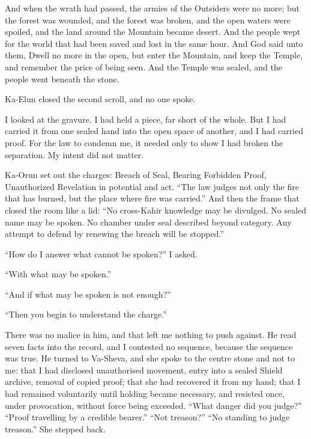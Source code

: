 \begin{scripture}
And when the wrath had passed, the armies of the Outsiders were no more; but the forest was wounded, and the forest was broken, and the open waters were spoiled, and the land around the Mountain became desert.
And the people wept for the world that had been saved and lost in the same hour.
And God said unto them, Dwell no more in the open, but enter the Mountain, and keep the Temple, and remember the price of being seen.
And the Temple was sealed, and the people went beneath the stone.
\end{scripture}
 
Ka-Elun closed the second scroll, and no one spoke.\par
 
I looked at the gravure. I had held a piece, far short of the whole. But I had carried it from one sealed hand into the open space of another, and I had carried proof. For the law to condemn me, it needed only to show I had broken the separation. My intent did not matter.\par
 
Ka-Orun set out the charges: Breach of Seal, Bearing Forbidden Proof, Unauthorized Revelation in potential and act. ``The law judges not only the fire that has burned, but the place where fire was carried.'' And then the frame that closed the room like a lid: ``No cross-Kahir knowledge may be divulged. No sealed name may be spoken. No chamber under seal described beyond category. Any attempt to defend by renewing the breach will be stopped.''\par
 
``How do I answer what cannot be spoken?'' I asked.\par
 
``With what may be spoken.''\par
 
``And if what may be spoken is not enough?''\par
 
``Then you begin to understand the charge.''\par
 
There was no malice in him, and that left me nothing to push against. He read seven facts into the record, and I contested no sequence, because the sequence was true. He turned to Va-Sheva, and she spoke to the centre stone and not to me: that I had disclosed unauthorised movement, entry into a sealed Shield archive, removal of copied proof; that she had recovered it from my hand; that I had remained voluntarily until holding became necessary, and resisted once, under provocation, without force being exceeded. ``What danger did you judge?'' ``Proof travelling by a credible bearer.'' ``Not treason?'' ``No standing to judge treason.'' She stepped back.\par
 
